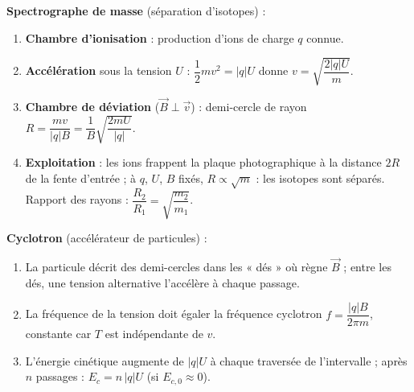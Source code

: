 \documentclass[11pt]{article}
\begin{document}
\begin{methode}
\textbf{Spectrographe de masse} (séparation d'isotopes) :
\begin{enumerate}
\item \textbf{Chambre d'ionisation} : production d'ions de charge $q$ connue.
\item \textbf{Accélération} sous la tension $U$ : $\dfrac{1}{2}mv^2=|q|U$ donne $v=\sqrt{\dfrac{2|q|U}{m}}$.
\item \textbf{Chambre de déviation} ($\vec{B}\perp\vec{v}$) : demi-cercle de rayon $R=\dfrac{mv}{|q|B}=\dfrac{1}{B}\sqrt{\dfrac{2mU}{|q|}}$.
\item \textbf{Exploitation} : les ions frappent la plaque photographique à la distance $2R$ de la fente d'entrée ; à $q$, $U$, $B$ fixés, $R\propto\sqrt{m}$ : les isotopes sont séparés. Rapport des rayons : $\dfrac{R_2}{R_1}=\sqrt{\dfrac{m_2}{m_1}}$.
\end{enumerate}
\textbf{Cyclotron} (accélérateur de particules) :
\begin{enumerate}
\item La particule décrit des demi-cercles dans les « dés » où règne $\vec{B}$ ; entre les dés, une tension alternative l'accélère à chaque passage.
\item La fréquence de la tension doit égaler la fréquence cyclotron $f=\dfrac{|q|B}{2\pi m}$, constante car $T$ est indépendante de $v$.
\item L'énergie cinétique augmente de $|q|U$ à chaque traversée de l'intervalle ; après $n$ passages : $E_c=n\,|q|U$ (si $E_{c,0}\approx 0$).
\end{enumerate}
\end{methode}
\end{document}

